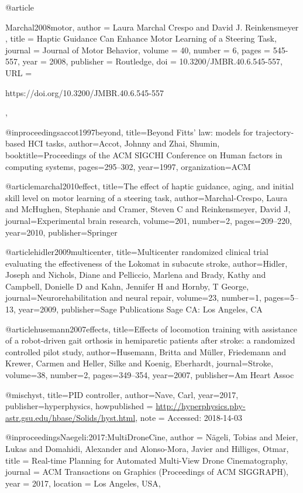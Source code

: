 @article{Marchal2008motor,
author = { Laura Marchal   Crespo  and  David J.   Reinkensmeyer },
title = {Haptic Guidance Can Enhance Motor Learning of a Steering Task},
journal = {Journal of Motor Behavior},
volume = {40},
number = {6},
pages = {545-557},
year  = {2008},
publisher = {Routledge},
doi = {10.3200/JMBR.40.6.545-557},
URL = { 
        https://doi.org/10.3200/JMBR.40.6.545-557
    
},
}

@inproceedings{accot1997beyond,
  title={Beyond Fitts' law: models for trajectory-based HCI tasks},
  author={Accot, Johnny and Zhai, Shumin},
  booktitle={Proceedings of the ACM SIGCHI Conference on Human factors in computing systems},
  pages={295--302},
  year={1997},
  organization={ACM}
}


@article{marchal2010effect,
  title={The effect of haptic guidance, aging, and initial skill level on motor learning of a steering task},
  author={Marchal-Crespo, Laura and McHughen, Stephanie and Cramer, Steven C and Reinkensmeyer, David J},
  journal={Experimental brain research},
  volume={201},
  number={2},
  pages={209--220},
  year={2010},
  publisher={Springer}
}

@article{hidler2009multicenter,
  title={Multicenter randomized clinical trial evaluating the effectiveness of the Lokomat in subacute stroke},
  author={Hidler, Joseph and Nichols, Diane and Pelliccio, Marlena and Brady, Kathy and Campbell, Donielle D and Kahn, Jennifer H and Hornby, T George},
  journal={Neurorehabilitation and neural repair},
  volume={23},
  number={1},
  pages={5--13},
  year={2009},
  publisher={Sage Publications Sage CA: Los Angeles, CA}
}

@article{husemann2007effects,
  title={Effects of locomotion training with assistance of a robot-driven gait orthosis in hemiparetic patients after stroke: a randomized controlled pilot study},
  author={Husemann, Britta and M{\"u}ller, Friedemann and Krewer, Carmen and Heller, Silke and Koenig, Eberhardt},
  journal={Stroke},
  volume={38},
  number={2},
  pages={349--354},
  year={2007},
  publisher={Am Heart Assoc}
}

@misc{hyst,
  title={PID controller},
  author={Nave, Carl},
  year={2017},
  publisher={hyperphysics},
  howpublished = {\url{http://hyperphysics.phy-astr.gsu.edu/hbase/Solids/hyst.html}},
  note = {Accessed: 2018-14-03}
}

@inproceedings{Naegeli:2017:MultiDroneCine,
	author = {N{\"a}geli, Tobias and Meier, Lukas and Domahidi, Alexander and Alonso-Mora, Javier and Hilliges, Otmar},
	title = {Real-time Planning for Automated Multi-View Drone Cinematography},
	journal = {ACM Transactions on Graphics (Proceedings of ACM SIGGRAPH)},
	year = {2017},
	location = {Los Angeles, USA},
}

